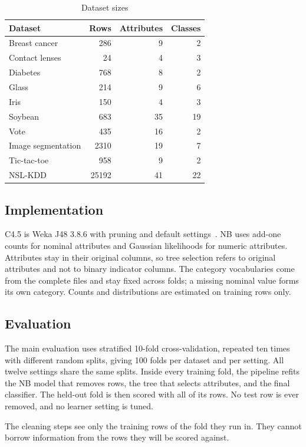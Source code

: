 \documentclass[conference]{IEEEtran}
\begin{document}
\begin{table}[t]
\caption{Dataset sizes}
\label{tab:data}
\centering
\begin{tabular}{lrrr}
\toprule
Dataset & Rows & Attributes & Classes \\
\midrule
Breast cancer & 286 & 9 & 2 \\
Contact lenses & 24 & 4 & 3 \\
Diabetes & 768 & 8 & 2 \\
Glass & 214 & 9 & 6 \\
Iris & 150 & 4 & 3 \\
Soybean & 683 & 35 & 19 \\
Vote & 435 & 16 & 2 \\
Image segmentation & 2310 & 19 & 7 \\
Tic-tac-toe & 958 & 9 & 2 \\
NSL-KDD & 25192 & 41 & 22 \\
\bottomrule
\end{tabular}
\end{table}

\subsection{Implementation}
C4.5 is Weka J48 3.8.6 with pruning and default
settings~\cite{witten2016weka}. NB uses add-one counts for nominal attributes
and Gaussian likelihoods for numeric attributes. Attributes stay in their
original columns, so tree selection refers to original attributes and not to
binary indicator columns. The category vocabularies come from the complete
files and stay fixed across folds; a missing nominal value forms its own
category. Counts and distributions are estimated on training rows only.

\subsection{Evaluation}
The main evaluation uses stratified 10-fold cross-validation, repeated ten
times with different random splits, giving 100 folds per dataset and per
setting. All twelve settings share the same splits. Inside every training
fold, the pipeline refits the NB model that removes rows, the tree that selects
attributes, and the final classifier. The held-out fold is then scored with all
of its rows. No test row is ever removed, and no learner setting is tuned.

The cleaning steps see only the training rows of the fold they run in. They
cannot borrow information from the rows they will be scored against.
\end{document}

